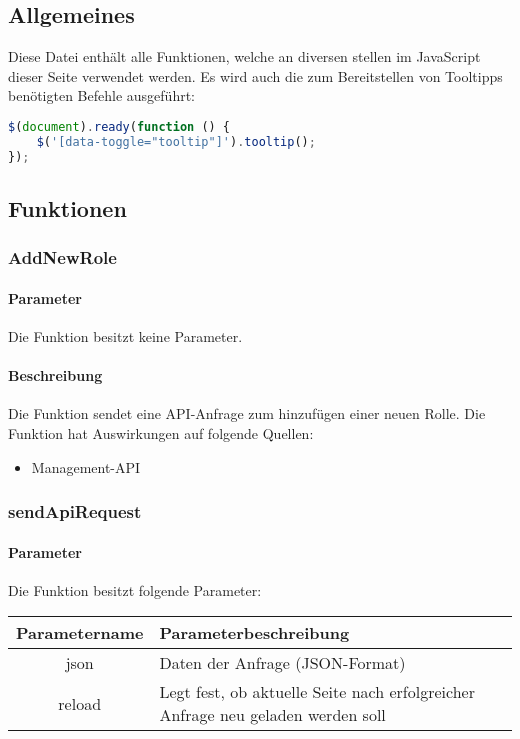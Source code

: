 \subsection{Allgemeines} Diese Datei enthält alle Funktionen, welche an diversen stellen im JavaScript dieser Seite verwendet werden.
Es wird auch die zum Bereitstellen von Tooltipps benötigten Befehle ausgeführt:
\begin{lstlisting}[language=JavaScript]
$(document).ready(function () {
	$('[data-toggle="tooltip"]').tooltip();
});
\end{lstlisting}
\subsection{Funktionen}
\subsubsection{AddNewRole}
\paragraph{Parameter} Die Funktion besitzt keine Parameter.
\paragraph{Beschreibung} Die Funktion sendet eine API-Anfrage zum hinzufügen einer neuen Rolle. Die Funktion hat Auswirkungen auf folgende Quellen:
\begin{itemize}
	\item Management-API
\end{itemize}
\subsubsection{sendApiRequest}
\paragraph{Parameter} Die Funktion besitzt folgende Parameter:
\begin{table}[H]
	\begin{tabular}{|c|p{11cm}|}
		\hline
		\textbf{Parametername} & \textbf{Parameterbeschreibung} \\ \hline
		json   & Daten der Anfrage (JSON-Format) \\ \hline
		reload & Legt fest, ob aktuelle Seite nach erfolgreicher Anfrage neu geladen werden soll \\ \hline
	\end{tabular}
\end{table}
